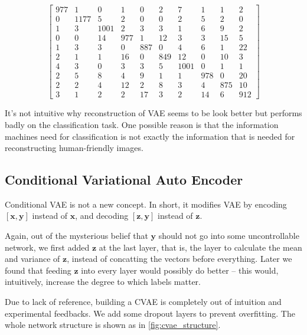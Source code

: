 \documentclass[a4paper,10pt,UTF8]{article}
\renewcommand*{\vec}[1]{\boldsymbol{#1}}
\numberwithin{equation}{section}
\numberwithin{figure}{section}
\begin{document}
$$
\begin{bmatrix}
 977 &    1 &    0 &    1 &    0 &    2 &    7 &    1 &    1 &    2 \\
   0 & 1177 &    5 &    2 &    0 &    0 &    2 &    5 &    2 &    0 \\
   1 &    3 & 1001 &    2 &    3 &    3 &    1 &    6 &    9 &    2 \\
   0 &    0 &   14 &  977 &    1 &   12 &    3 &    3 &   15 &    5 \\
   1 &    3 &    3 &    0 &  887 &    0 &    4 &    6 &    1 &   22 \\
   2 &    1 &    1 &   16 &    0 &  849 &   12 &    0 &   10 &    3 \\
   4 &    3 &    0 &    3 &    3 &    5 & 1001 &    0 &    1 &    1 \\
   2 &    5 &    8 &    4 &    9 &    1 &    1 &  978 &    0 &   20 \\
   2 &    2 &    4 &   12 &    2 &    8 &    3 &    4 &  875 &   10 \\
   3 &    1 &    2 &    2 &   17 &    3 &    2 &   14 &    6 &  912
\end{bmatrix}
$$

It's not intuitive why reconstruction of VAE seems to be look better but performs badly on the classification task. One possible reason is that the information machines need for classification is not exactly the information that is needed for reconstructing human-friendly images. 

\subsection{Conditional Variational Auto Encoder}

Conditional VAE is not a new concept. In short, it modifies VAE by encoding $[\vec{x},\vec{y}]$ instead of $\vec{x}$, and decoding $[\vec{z},\vec{y}]$ instead of $\vec{z}$.

Again, out of the mysterious belief that $\vec{y}$ should not go into some uncontrollable network, we first added $\vec{z}$ at the last layer, that is, the layer to calculate the mean and variance of $\vec{z}$, instead of concatting the vectors before everything. Later we found that feeding $\vec{z}$ into every layer would possibly do better -- this would, intuitively, increase the degree to which labels matter.

Due to lack of reference, building a CVAE is completely out of intuition and experimental feedbacks. We add some dropout layers to prevent overfitting. The whole network structure is shown as in \autoref{fig:cvae_structure}.
\end{document}
